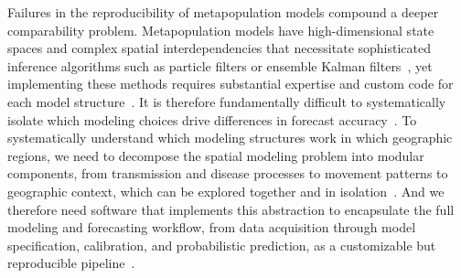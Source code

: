 Failures in the reproducibility of metapopulation models compound a deeper comparability problem. 
Metapopulation models have high-dimensional state spaces and complex spatial interdependencies that necessitate sophisticated inference algorithms such as particle filters or ensemble Kalman filters~\citep{king_statistical_2016,ganyani_simulation_2021,ionides_iterated_2024}, yet implementing these methods requires substantial expertise and custom code for each model structure~\citep{asfaw_tutorial_2024,ning_iterated_2023,funk_choices_2020}. 
It is therefore fundamentally difficult to systematically isolate which modeling choices drive differences in forecast accuracy~\citep{shea_harnessing_2020,reich_collaborative_2022,cdc_flusight_2026,loo_us_2024}. 
To systematically understand which modeling structures work in which geographic regions, we need to decompose the spatial modeling problem into modular components, from transmission and disease processes to movement patterns to geographic context, which can be explored together and in isolation~\citep{bicker_memilio_2026,lemaitre_flepimop_2024,oshinubi_systematic_2026}.
And we therefore need software that implements this abstraction to encapsulate the full modeling and forecasting workflow, from data acquisition through model specification, calibration, and probabilistic prediction, as a customizable but reproducible pipeline~\citep{lutz_applying_2019,moran_future_2025,birrell_evidence_2018}.

